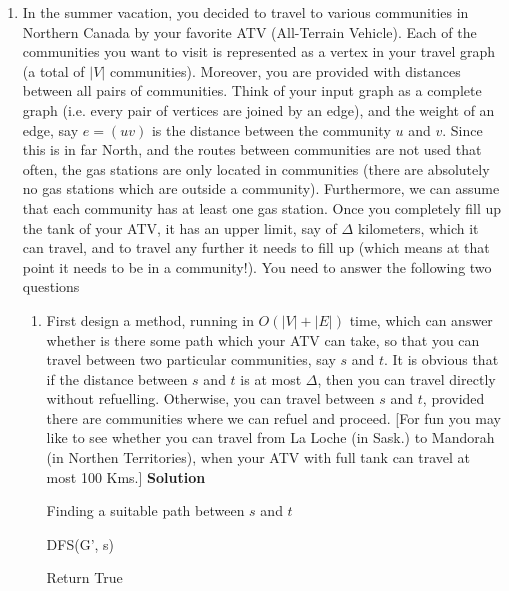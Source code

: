 \documentclass[12pt]{article}
\begin{document}
\begin{enumerate}
\item \color{blue}In the summer vacation, you decided to travel to various communities in Northern Canada by your favorite ATV (All-Terrain Vehicle).
Each of the communities you want to visit is
represented as a vertex in your travel graph (a total of $|V|$ communities). Moreover, you are provided with distances between  all pairs of  communities. Think of your input graph as a complete graph (i.e. every pair of vertices are joined by an edge), and the weight of an edge, say $e=(uv)$ is the distance
between the community $u$ and $v$. Since this is in far North, and the routes between communities are not used that often, the gas stations 
are only located in communities (there are absolutely no gas stations which are outside a community). Furthermore, we can assume
that each community has at least one gas station. Once you completely fill up the tank of your ATV, it has an upper limit, say of $\Delta$ kilometers, which it can travel, and to travel any further it needs to fill up (which means at that point it needs to be in a community!).
You need to answer the following two questions

\begin{enumerate}
\item First design a method, running in $O(|V|+|E|)$ time, which can answer whether is there some path which your ATV can take, so that 
you can travel between two particular communities, say $s$ and $t$. It is obvious that if the distance between $s$ and $t$ is at most $\Delta$, then you can travel directly without refuelling. Otherwise, you can travel between $s$ and $t$, provided there are communities where we can
refuel and proceed. [For fun you may like to see whether you can travel from La Loche (in Sask.) to Mandorah (in Northen Territories), when your ATV with full tank can travel at most 100 Kms.]
\newpage
\color{black}
\textbf{Solution}
\begin{algorithm}
\caption{Finding a suitable path between $s$ and $t$}
\begin{algorithmic}[1]
 
	
	\State DFS(G', s) 
	
		\State Return True
	\EndIf
	

\end{algorithmic}
\end{algorithm}
\end{enumerate}
\end{enumerate}
\end{document}
